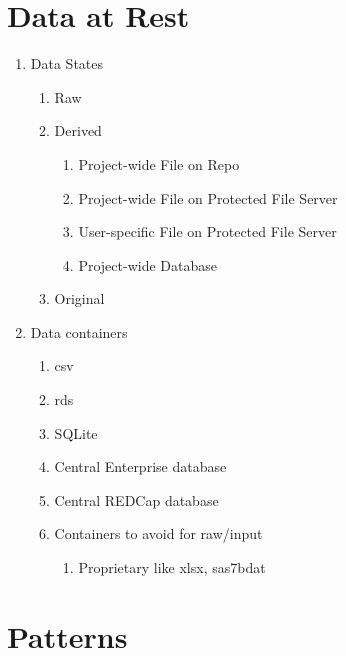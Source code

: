 \documentclass[]{book}
\providecommand{\tightlist}{%
  \setlength{\itemsep}{0pt}\setlength{\parskip}{0pt}}
\theoremstyle{definition}
\theoremstyle{definition}
\theoremstyle{definition}
\theoremstyle{remark}
\begin{document}
\hypertarget{data-at-rest}{%
\chapter{Data at Rest}\label{data-at-rest}}

\begin{enumerate}
\def\labelenumi{\arabic{enumi}.}
\tightlist
\item
  Data States

  \begin{enumerate}
  \def\labelenumii{\arabic{enumii}.}
  \tightlist
  \item
    Raw
  \item
    Derived

    \begin{enumerate}
    \def\labelenumiii{\arabic{enumiii}.}
    \tightlist
    \item
      Project-wide File on Repo
    \item
      Project-wide File on Protected File Server
    \item
      User-specific File on Protected File Server
    \item
      Project-wide Database
    \end{enumerate}
  \item
    Original
  \end{enumerate}
\item
  Data containers

  \begin{enumerate}
  \def\labelenumii{\arabic{enumii}.}
  \tightlist
  \item
    csv
  \item
    rds
  \item
    SQLite
  \item
    Central Enterprise database
  \item
    Central REDCap database
  \item
    Containers to avoid for raw/input

    \begin{enumerate}
    \def\labelenumiii{\arabic{enumiii}.}
    \tightlist
    \item
      Proprietary like xlsx, sas7bdat
    \end{enumerate}
  \end{enumerate}
\end{enumerate}

\hypertarget{patterns}{%
\chapter{Patterns}\label{patterns}}
\end{document}
